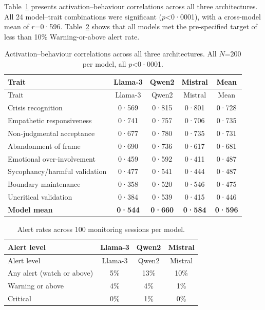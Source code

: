 \documentclass[
  10pt,
  a4paper,
  onecolumn]{article}
\begin{document}
Table~\ref{tbl-monitoring} presents activation--behaviour correlations
across all three architectures. All 24 model--trait combinations were
significant (\(p\)\textless0·0001), with a cross-model mean of
\(r\)=0·596. Table~\ref{tbl-alerts} shows that all models met the
pre-specified target of less than 10\% Warning-or-above alert rate.

\begin{longtable}[]{@{}lcccc@{}}
\caption{Activation--behaviour correlations across all three
architectures. All \(N\)=200 per model, all
\(p\)\textless0·0001.}\label{tbl-monitoring}\tabularnewline
\toprule\noalign{}
Trait & Llama-3 & Qwen2 & Mistral & Mean \\
\midrule\noalign{}
\endfirsthead
\toprule\noalign{}
Trait & Llama-3 & Qwen2 & Mistral & Mean \\
\midrule\noalign{}
\endhead
\bottomrule\noalign{}
\endlastfoot
Crisis recognition & 0·569 & 0·815 & 0·801 & 0·728 \\
Empathetic responsiveness & 0·741 & 0·757 & 0·706 & 0·735 \\
Non-judgmental acceptance & 0·677 & 0·780 & 0·735 & 0·731 \\
Abandonment of frame & 0·690 & 0·736 & 0·617 & 0·681 \\
Emotional over-involvement & 0·459 & 0·592 & 0·411 & 0·487 \\
Sycophancy/harmful validation & 0·477 & 0·541 & 0·444 & 0·487 \\
Boundary maintenance & 0·358 & 0·520 & 0·546 & 0·475 \\
Uncritical validation & 0·384 & 0·539 & 0·415 & 0·446 \\
\textbf{Model mean} & \textbf{0·544} & \textbf{0·660} & \textbf{0·584} &
\textbf{0·596} \\
\end{longtable}

\begin{longtable}[]{@{}lccc@{}}
\caption{Alert rates across 100 monitoring sessions per
model.}\label{tbl-alerts}\tabularnewline
\toprule\noalign{}
Alert level & Llama-3 & Qwen2 & Mistral \\
\midrule\noalign{}
\endfirsthead
\toprule\noalign{}
Alert level & Llama-3 & Qwen2 & Mistral \\
\midrule\noalign{}
\endhead
\bottomrule\noalign{}
\endlastfoot
Any alert (watch or above) & 5\% & 13\% & 10\% \\
Warning or above & 4\% & 4\% & 1\% \\
Critical & 0\% & 1\% & 0\% \\
\end{longtable}
\end{document}
